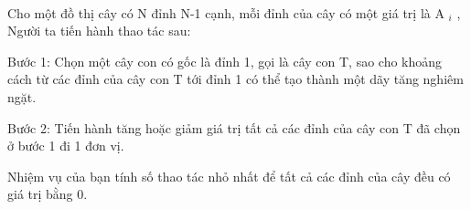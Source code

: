  

Cho một đồ thị cây có N đỉnh N-1 cạnh, mỗi đỉnh của cây có một giá trị là A $_ i $ , Người ta tiến hành thao tác sau:

Bước 1: Chọn một cây con có gốc là đỉnh 1, gọi là cây con T, sao cho khoảng cách từ các đỉnh của cây con T tới đỉnh 1 có thể tạo thành một dãy tăng nghiêm ngặt.

Bước 2: Tiến hành tăng hoặc giảm giá trị tất cả các đỉnh của cây con T đã chọn ở bước 1 đi 1 đơn vị.

Nhiệm vụ của bạn tính số thao tác nhỏ nhất để tất cả các đỉnh của cây đều có giá trị bằng 0.

\